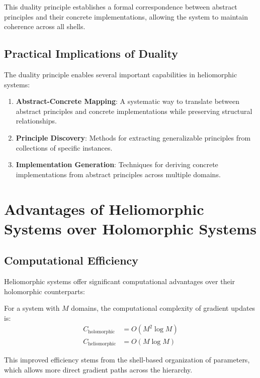 This duality principle establishes a formal correspondence between abstract principles and their concrete implementations, allowing the system to maintain coherence across all shells.

\subsection{Practical Implications of Duality}

The duality principle enables several important capabilities in heliomorphic systems:

\begin{enumerate}
    \item \textbf{Abstract-Concrete Mapping}: A systematic way to translate between abstract principles and concrete implementations while preserving structural relationships.
    
    \item \textbf{Principle Discovery}: Methods for extracting generalizable principles from collections of specific instances.
    
    \item \textbf{Implementation Generation}: Techniques for deriving concrete implementations from abstract principles across multiple domains.
\end{enumerate}

\section{Advantages of Heliomorphic Systems over Holomorphic Systems}

\subsection{Computational Efficiency}

Heliomorphic systems offer significant computational advantages over their holomorphic counterparts:

\begin{proposition}
For a system with $M$ domains, the computational complexity of gradient updates is:
\begin{align}
C_{\text{holomorphic}} &= O(M^2 \log M) \\
C_{\text{heliomorphic}} &= O(M \log M)
\end{align}
\end{proposition}

This improved efficiency stems from the shell-based organization of parameters, which allows more direct gradient paths across the hierarchy.

